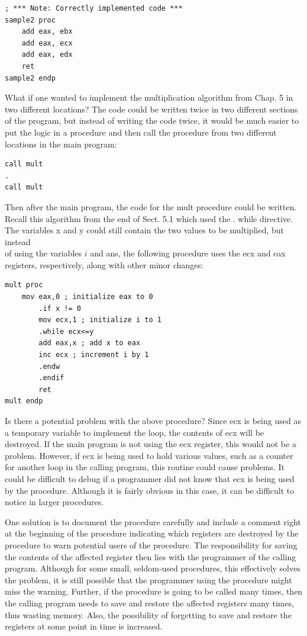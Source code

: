 \documentclass[10pt]{book}
\begin{document}
\begin{verbatim}
; *** Note: Correctly implemented code ***
sample2 proc
    add eax, ebx
    add eax, ecx
    add eax, edx
    ret
sample2 endp
\end{verbatim}

What if one wanted to implement the multiplication algorithm from Chap. 5 in two different locations? The code could be written twice in two different sections of the program, but instead of writing the code twice, it would be much easier to put the logic in a procedure and then call the procedure from two different locations in the main program:

\begin{verbatim}
call mult
.
call mult
\end{verbatim}

Then after the main program, the code for the mult procedure could be written. Recall this algorithm from the end of Sect. 5.1 which used the . while directive. The variables x and y could still contain the two values to be multiplied, but instead\\
of using the variables $i$ and ans, the following procedure uses the ecx and eax registers, respectively, along with other minor changes:
\begin{verbatim}
mult proc
    mov eax,0 ; initialize eax to 0
        .if x != 0
        mov ecx,1 ; initialize i to 1
        .while ecx<=y
        add eax,x ; add x to eax
        inc ecx ; increment i by 1
        .endw
        .endif
        ret
mult endp
\end{verbatim}

Is there a potential problem with the above procedure? Since ecx is being used as a temporary variable to implement the loop, the contents of ecx will be destroyed. If the main program is not using the ecx register, this would not be a problem. However, if ecx is being used to hold various values, such as a counter for another loop in the calling program, this routine could cause problems. It could be difficult to debug if a programmer did not know that ecx is being used by the procedure. Although it is fairly obvious in this case, it can be difficult to notice in larger procedures.

One solution is to document the procedure carefully and include a comment right at the beginning of the procedure indicating which registers are destroyed by the procedure to warn potential users of the procedure. The responsibility for saving the contents of the affected register then lies with the programmer of the calling program. Although for some small, seldom-used procedures, this effectively solves the problem, it is still possible that the programmer using the procedure might miss the warning. Further, if the procedure is going to be called many times, then the calling program needs to save and restore the affected registers many times, thus wasting memory. Also, the possibility of forgetting to save and restore the registers at some point in time is increased.
\end{document}

